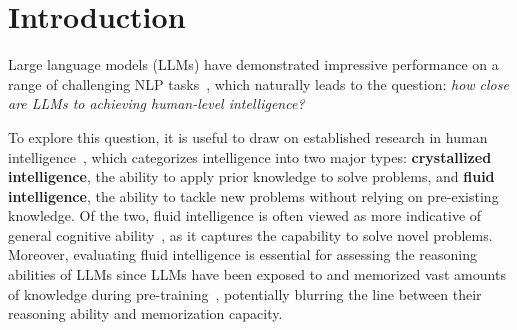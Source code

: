 \section{Introduction}
\label{intro}
Large language models (LLMs) have demonstrated impressive performance on a range of challenging NLP tasks~\cite{davis2023benchmarks, zhao2024large, wang2023hypothesis, yang2024language, frieder2024mathematical}, %
which naturally leads to the question: \emph{how close are LLMs to achieving human-level intelligence?}

To explore this question, it is useful to draw on established research in human intelligence~\cite{cattell1963theory, cattell1971abilities}, which categorizes intelligence into two major types: \textbf{crystallized intelligence}, the ability to apply prior knowledge to solve problems, and \textbf{fluid intelligence}, the ability to tackle new problems without relying on pre-existing knowledge. Of the two, fluid intelligence is often viewed as more indicative of general cognitive ability~\cite{jaeggi2008improving, chollet2019measure, barak2024investigating}, as it captures the capability to solve novel problems. %
Moreover, evaluating fluid intelligence is essential for assessing the reasoning abilities of LLMs since LLMs have been exposed to and memorized vast amounts of knowledge during pre-training~\cite{kaplan2020scaling, biderman2024emergent}, potentially blurring the line between their reasoning ability and memorization capacity.



